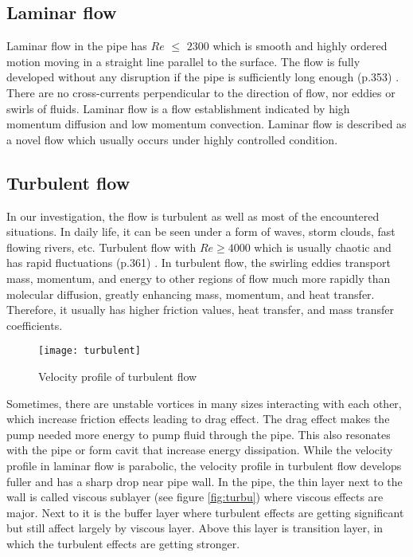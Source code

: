 \subsection{Laminar flow}

Laminar flow in the pipe has $Re$ $\leq$ $2300$ which is smooth and highly ordered motion moving in a straight line parallel to the surface. The flow is fully developed without any disruption if the pipe is sufficiently long enough (p.353) \cite{cengel:book}. There are no cross-currents perpendicular to the direction of flow, nor eddies or swirls of fluids. Laminar flow is a flow establishment indicated by high momentum diffusion and low momentum convection. Laminar flow is described as a novel flow which usually occurs under highly controlled condition.

\subsection{Turbulent flow}

In our investigation, the flow is turbulent as well as most of the encountered situations. In daily life, it can be seen under a form of waves, storm clouds, fast flowing rivers, etc. Turbulent flow with $Re \geq 4000$ which is usually chaotic and has rapid fluctuations (p.361) \cite{cengel:book}. In turbulent flow, the swirling eddies transport mass, momentum, and energy to other regions of flow much more rapidly than molecular diffusion, greatly enhancing mass, momentum, and heat transfer. Therefore, it usually has higher friction values, heat transfer, and mass transfer coefficients. 
\begin{wrapfigure}{r}{0.5\textwidth}
  \begin{center}
    \texttt{[image: turbulent]}
  \end{center}
  \caption{Velocity profile of turbulent flow \cite{cengel:book}}
  \label{fig:turbu}
\end{wrapfigure}
Sometimes, there are unstable vortices in many sizes interacting with each other, which increase friction effects leading to drag effect. The drag effect makes the pump needed more energy to pump fluid through the pipe. This also resonates with the pipe or form \gls{cavit} that increase energy dissipation. While the velocity profile in laminar flow is parabolic, the velocity profile in turbulent flow develops fuller and has a sharp drop near pipe wall.  In the pipe, the thin layer next to the wall is called viscous sublayer (see figure \vref{fig:turbu}) where viscous effects are major. Next to it is the buffer layer where turbulent effects are getting significant but still affect largely by viscous layer. Above this layer is transition layer, in which the turbulent effects are getting stronger. 

